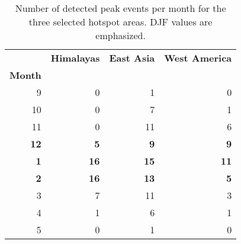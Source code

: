 \begin{table}
\label{tab:events}
\caption{Number of detected peak events per month for the three selected hotspot areas. DJF values are emphasized.}
\centering
\begin{tabular}{rrrr}
	\hline
	{} &  \textbf{Himalayas} &  \textbf{East Asia} &  \textbf{West America} \\
	\textbf{Month} &            &           &           \\
	\hline
	9     &        0 &         1 &       0 \\
	10    &        0 &         7 &       1 \\
	11    &        0 &        11 &       6 \\
	\textbf{12}    &       \textbf{5} &         \textbf{9} &       \textbf{9} \\
	\textbf{1}     &       \textbf{16} &        \textbf{15} &      \textbf{11} \\
	\textbf{2}     &       \textbf{16} &        \textbf{13} &      \textbf{5} \\
	3     &        7 &        11 &       3 \\
	4     &        1 &         6 &       1 \\
	5     &        0 &         1 &       0 \\
	\hline
\end{tabular}
\end{table}